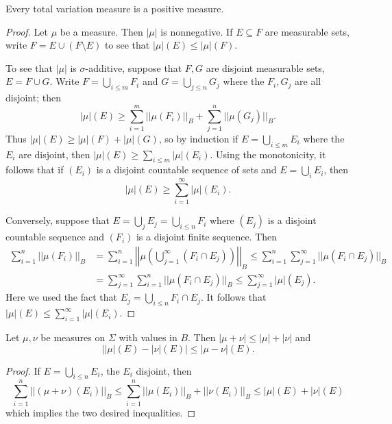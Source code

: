\begin{theorem}
Every total variation measure is a positive measure.
\end{theorem}
\begin{proof}
Let $\mu$ be a measure. Then $|\mu|$ is nonnegative. If $E \subseteq F$ are measurable sets, write $F = E \cup (F \setminus E)$ to see that $|\mu|(E) \leq |\mu|(F)$.

To see that $|\mu|$ is $\sigma$-additive, suppose that $F,G$ are disjoint measurable sets, $E = F \cup G$.
Write $F = \bigcup_{i \leq m} F_{i}$ and $G = \bigcup_{j \leq n} G_{j}$ where the $F_{i},G_{j}$ are all disjoint; then
\[|\mu|(E) \geq \sum_{i=1}^{m} ||\mu(F_{i})||_{B} + \sum_{j=1}^{n} ||\mu(G_{j})||_{B}.\]
Thus $|\mu|(E) \geq |\mu|(F) + |\mu|(G)$, so by induction if $E = \bigcup_{i \leq m} E_{i}$ where the $E_{i}$ are disjoint, then $|\mu|(E) \geq \sum_{i \leq m} |\mu|(E_{i})$.
Using the monotonicity, it follows that if $(E_{i})$ is a disjoint countable sequence of sets and $E = \bigcup_{i} E_{i}$, then
\[|\mu|(E) \geq \sum_{i=1}^{\infty} |\mu|(E_{i}).\]

Conversely, suppose that $E = \bigcup_{j} E_{j} = \bigcup_{i\leq n} F_{i}$ where $(E_{j})$ is a disjoint countable sequence and $(F_{i})$ is a disjoint finite sequence. Then
\begin{align*}
\sum_{i=1}^{n} ||\mu(F_{i})||_{B} &= \sum_{i=1}^{n} \left|\left|\mu\left(\bigcup_{j=1}^{\infty} \left(F_{i} \cap E_{j}\right)\right)\right|\right|_{B} \leq \sum_{i=1}^{n} \sum_{j=1}^{\infty} ||\mu(F_{i} \cap E_{j})||_{B} \\
&= \sum_{j=1}^{\infty} \sum_{i=1}^{n} ||\mu(F_{i} \cap E_{j})||_{B} \leq \sum_{j=1}^{\infty} |\mu|(E_{j}).
\end{align*}
Here we used the fact that $E_{j} = \bigcup_{i \leq n} F_{i} \cap E_{j}$. It follows that $|\mu|(E) \leq \sum_{i=1}^{\infty} |\mu|(E_{i})$.
\end{proof}

\begin{theorem}\label{reverse triangle inequality}
Let $\mu,\nu$ be measures on $\Sigma$ with values in $B$. Then $|\mu + \nu| \leq |\mu| + |\nu|$ and
\[||\mu|(E) - |\nu|(E)| \leq |\mu - \nu|(E).\]
\end{theorem}
\begin{proof}
If $E = \bigcup_{i \leq n} E_{i}$, the $E_{i}$ disjoint, then
\[\sum_{i=1}^{n} ||(\mu + \nu)(E_{i})||_{B} \leq \sum_{i=1}^{n} ||\mu(E_{i})||_{B} + ||\nu(E_{i})||_{B} \leq |\mu|(E) + |\nu|(E)\]
which implies the two desired inequalities.
\end{proof}

